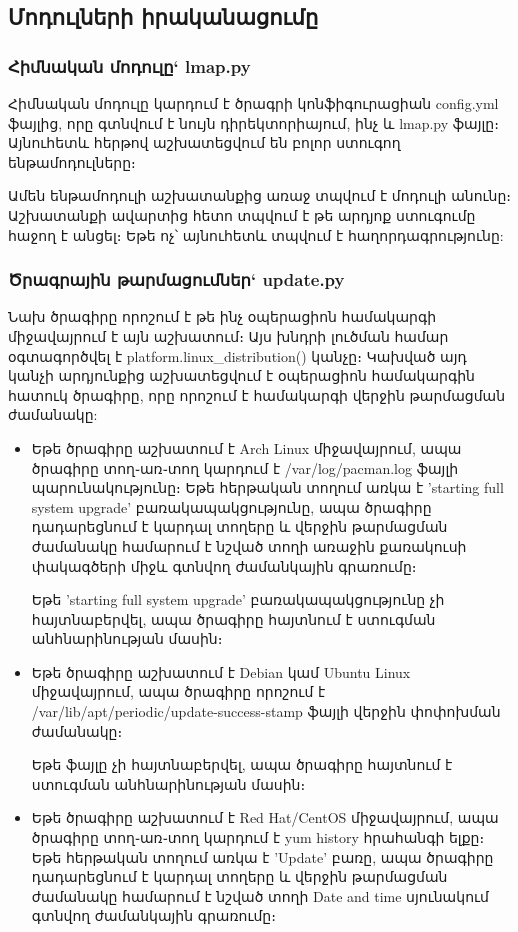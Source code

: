 \documentclass[a4paper,12pt]{article}
\begin{document}
\begin{sloppypar}
\subsection{Մոդուլների իրականացումը}


\subsubsection{Հիմնական մոդուլը` lmap.py}


Հիմնական մոդուլը կարդում է ծրագրի կոնֆիգուրացիան config.yml ֆայլից,
որը գտնվում է նույն դիրեկտորիայում, ինչ և lmap.py ֆայլը։ Այնուհետև
հերթով աշխատեցվում են բոլոր ստուգող ենթամոդուլները։

Ամեն ենթամոդուլի աշխատանքից առաջ տպվում է մոդուլի անունը։
Աշխատանքի ավարտից հետո տպվում է թե արդյոք ստուգումը հաջող է անցել։
Եթե ոչ՝ այնուհետև տպվում է հաղորդագրությունը:


\subsubsection{Ծրագրային թարմացումներ` update.py}


Նախ ծրագիրը որոշում է թե ինչ օպերացիոն համակարգի միջավայրում է այն աշխատում։
Այս խնդրի լուծման համար օգտագործվել է platform.linux\_distribution() կանչը։
Կախված այդ կանչի արդյունքից աշխատեցվում է օպերացիոն համակարգին հատուկ
ծրագիրը, որը որոշում է համակարգի վերջին թարմացման ժամանակը:

\begin{itemize}
\item Եթե ծրագիրը աշխատում է Arch Linux միջավայրում, ապա ծրագիրը տող֊առ֊տող
    կարդում է /var/log/pacman.log ֆայլի պարունակությունը։ Եթե հերթական տողում առկա է
	'starting full system upgrade' բառակապակցությունը, ապա ծրագիրը դադարեցնում
	է կարդալ տողերը և վերջին թարմացման ժամանակը համարում է նշված տողի առաջին
	քառակուսի փակագծերի միջև գտնվող ժամանկային գրառումը։

	Եթե 'starting full system upgrade' բառակապակցությունը չի հայտնաբերվել,
	ապա ծրագիրը հայտնում է ստուգման անհնարինության մասին։
\item Եթե ծրագիրը աշխատում է Debian կամ Ubuntu Linux միջավայրում, ապա ծրագիրը
	որոշում է /var/lib/apt/periodic/update-success-stamp ֆայլի վերջին փոփոխման
	ժամանակը։

	Եթե ֆայլը չի հայտնաբերվել, ապա ծրագիրը հայտնում է ստուգման անհնարինության
	մասին։
\item Եթե ծրագիրը աշխատում է Red Hat/CentOS միջավայրում, ապա ծրագիրը տող֊առ֊տող
    կարդում է yum history հրահանգի ելքը։ Եթե հերթական տողում առկա է
	'Update' բառը, ապա ծրագիրը դադարեցնում
	է կարդալ տողերը և վերջին թարմացման ժամանակը համարում է նշված տողի 
	Date and time սյունակում գտնվող ժամանկային գրառումը։


\end{itemize}
\end{sloppypar}
\end{document}
